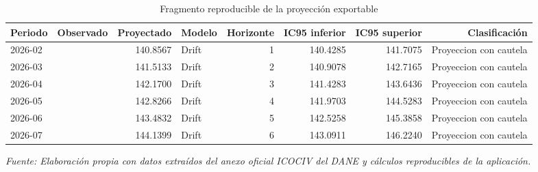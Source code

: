 \begin{table}[H]
\centering
\caption{Fragmento reproducible de la proyección exportable}
\label{tab:ejemplo_reproducibilidad_vias_urbanas}
\scriptsize
\begin{adjustbox}{max width=\linewidth}
\begin{tabular}{llrlrrrr}
\toprule
Periodo & Observado & Proyectado & Modelo & Horizonte & IC95 inferior & IC95 superior & Clasificación \\
\midrule
2026-02 &  & 140.8567 & Drift & 1 & 140.4285 & 141.7075 & Proyeccion con cautela \\
2026-03 &  & 141.5133 & Drift & 2 & 140.9078 & 142.7165 & Proyeccion con cautela \\
2026-04 &  & 142.1700 & Drift & 3 & 141.4283 & 143.6436 & Proyeccion con cautela \\
2026-05 &  & 142.8266 & Drift & 4 & 141.9703 & 144.5283 & Proyeccion con cautela \\
2026-06 &  & 143.4832 & Drift & 5 & 142.5258 & 145.3858 & Proyeccion con cautela \\
2026-07 &  & 144.1399 & Drift & 6 & 143.0911 & 146.2240 & Proyeccion con cautela \\
\bottomrule
\end{tabular}
\end{adjustbox}
\par\footnotesize\textit{Fuente: Elaboración propia con datos extraídos del anexo oficial ICOCIV del DANE y cálculos reproducibles de la aplicación.}
\end{table}
